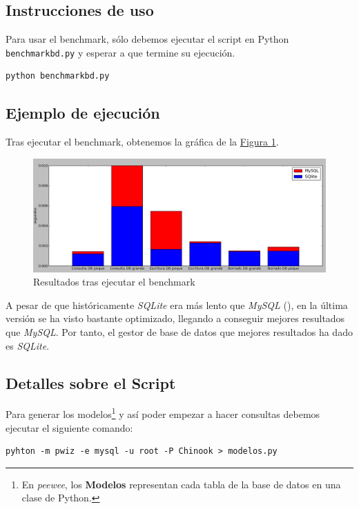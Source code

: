 \documentclass[10pt,a4paper,spanish]{article}
\numberwithin{equation}{section} %
\numberwithin{figure}{section} %
\numberwithin{table}{section} %
\begin{document}
\subsection{Instrucciones de uso}
Para usar el benchmark, sólo debemos ejecutar el script en Python \texttt{benchmarkbd.py} y esperar a que termine su ejecución.

\begin{verbatim}
python benchmarkbd.py
\end{verbatim}

\subsection{Ejemplo de ejecución}
Tras ejecutar el benchmark, obtenemos la gráfica de la \hyperref[benchmarkbasedatos]{Figura \ref*{benchmarkbasedatos}}.

\begin{figure}[!h]
    \centering
    \includegraphics[width=1\textwidth]{22}
    \caption{Resultados tras ejecutar el benchmark}
    \label{benchmarkbasedatos}
\end{figure}

A pesar de que históricamente \textit{SQLite} era más lento que \textit{MySQL} (\cite{speedcom}), en la última versión se ha visto bastante optimizado, llegando a conseguir mejores resultados que \textit{MySQL}. Por tanto, el gestor de base de datos que mejores resultados ha dado es \textit{SQLite}.

\subsection{Detalles sobre el Script}
Para generar los modelos\footnote{En \textit{peewee}, los \textbf{Modelos} representan cada tabla de la base de datos en una clase de Python.} y así poder empezar a hacer consultas debemos ejecutar el siguiente comando:
\begin{verbatim}
pyhton -m pwiz -e mysql -u root -P Chinook > modelos.py
\end{verbatim}
\end{document}
